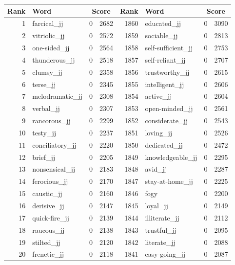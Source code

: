 \begin{table}[tbp]
    \begin{tabular}{| rlr@{.}l | rlr@{.}l |}
    \hline
    \textbf{Rank} & \textbf{Word} & \multicolumn{2}{c|}{\textbf{Score}} & \textbf{Rank} & \textbf{Word} & \multicolumn{2}{c|}{\textbf{Score}} \\
    \hline
    1 & farcical\_jj & 0 & 2682    &    1860 & educated\_jj & 0 & 3090 \\
    2 & vitriolic\_jj & 0 & 2572    &    1859 & sociable\_jj & 0 & 2813 \\
    3 & one-sided\_jj & 0 & 2564    &    1858 & self-sufficient\_jj & 0 & 2753 \\
    4 & thunderous\_jj & 0 & 2518    &    1857 & self-reliant\_jj & 0 & 2707 \\
    5 & clumsy\_jj & 0 & 2358    &    1856 & trustworthy\_jj & 0 & 2615 \\
    6 & terse\_jj & 0 & 2345    &    1855 & intelligent\_jj & 0 & 2606 \\
    7 & melodramatic\_jj & 0 & 2308    &    1854 & active\_jj & 0 & 2604 \\
    8 & verbal\_jj & 0 & 2307    &    1853 & open-minded\_jj & 0 & 2561 \\
    9 & rancorous\_jj & 0 & 2299    &    1852 & considerate\_jj & 0 & 2543 \\
    10 & testy\_jj & 0 & 2237    &    1851 & loving\_jj & 0 & 2526 \\
    11 & conciliatory\_jj & 0 & 2220    &    1850 & dedicated\_jj & 0 & 2472 \\
    12 & brief\_jj & 0 & 2205    &    1849 & knowledgeable\_jj & 0 & 2295 \\
    13 & nonsensical\_jj & 0 & 2183    &    1848 & avid\_jj & 0 & 2287 \\
    14 & ferocious\_jj & 0 & 2170    &    1847 & stay-at-home\_jj & 0 & 2225 \\
    15 & caustic\_jj & 0 & 2160    &    1846 & fogy & 0 & 2200 \\
    16 & derisive\_jj & 0 & 2147    &    1845 & loyal\_jj & 0 & 2149 \\
    17 & quick-fire\_jj & 0 & 2139    &    1844 & illiterate\_jj & 0 & 2112 \\
    18 & raucous\_jj & 0 & 2138    &    1843 & trustful\_jj & 0 & 2095 \\
    19 & stilted\_jj & 0 & 2120    &    1842 & literate\_jj & 0 & 2088 \\
    20 & frenetic\_jj & 0 & 2118    &    1841 & easy-going\_jj & 0 & 2087 \\

\end{tabular}
\end{table}
